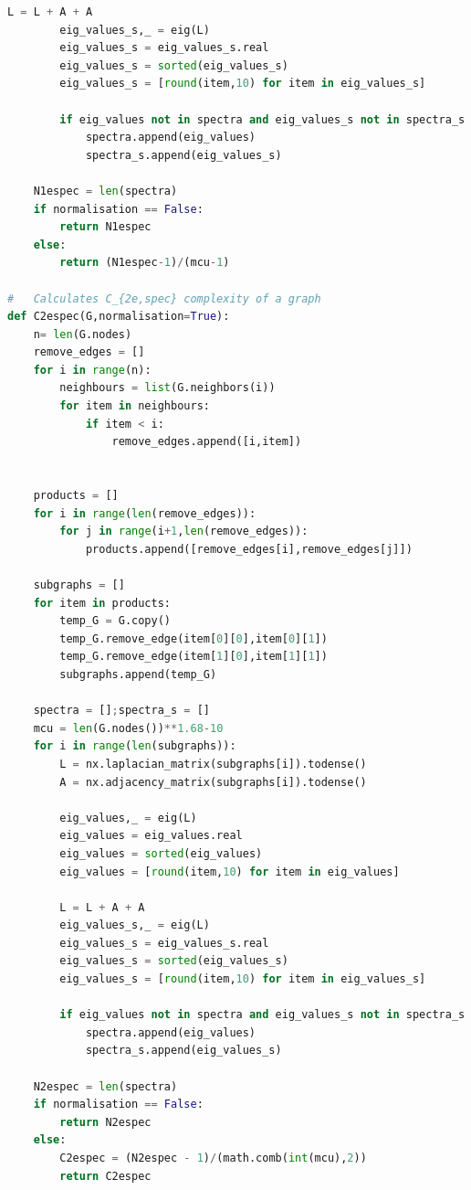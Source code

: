 \documentclass[12pt]{article}
\begin{document}
\begin{lstlisting}[language=Python,breaklines=true]
        L = L + A + A
        eig_values_s,_ = eig(L)
        eig_values_s = eig_values_s.real
        eig_values_s = sorted(eig_values_s)
        eig_values_s = [round(item,10) for item in eig_values_s]
        
        if eig_values not in spectra and eig_values_s not in spectra_s:
            spectra.append(eig_values)
            spectra_s.append(eig_values_s)
        
    N1espec = len(spectra)
    if normalisation == False:
        return N1espec
    else:
        return (N1espec-1)/(mcu-1)

#   Calculates C_{2e,spec} complexity of a graph
def C2espec(G,normalisation=True):
    n= len(G.nodes)
    remove_edges = []
    for i in range(n):
        neighbours = list(G.neighbors(i))
        for item in neighbours:
            if item < i:
                remove_edges.append([i,item])
    
    
    products = []
    for i in range(len(remove_edges)):
        for j in range(i+1,len(remove_edges)):
            products.append([remove_edges[i],remove_edges[j]])
    
    subgraphs = []
    for item in products:
        temp_G = G.copy()
        temp_G.remove_edge(item[0][0],item[0][1])
        temp_G.remove_edge(item[1][0],item[1][1])
        subgraphs.append(temp_G)
        
    spectra = [];spectra_s = []
    mcu = len(G.nodes())**1.68-10
    for i in range(len(subgraphs)):
        L = nx.laplacian_matrix(subgraphs[i]).todense()
        A = nx.adjacency_matrix(subgraphs[i]).todense()
        
        eig_values,_ = eig(L)
        eig_values = eig_values.real
        eig_values = sorted(eig_values)
        eig_values = [round(item,10) for item in eig_values]
        
        L = L + A + A
        eig_values_s,_ = eig(L)
        eig_values_s = eig_values_s.real
        eig_values_s = sorted(eig_values_s)
        eig_values_s = [round(item,10) for item in eig_values_s]
        
        if eig_values not in spectra and eig_values_s not in spectra_s:
            spectra.append(eig_values)
            spectra_s.append(eig_values_s)
            
    N2espec = len(spectra)
    if normalisation == False:
        return N2espec
    else:
        C2espec = (N2espec - 1)/(math.comb(int(mcu),2))
        return C2espec


\end{lstlisting}
\end{document}
